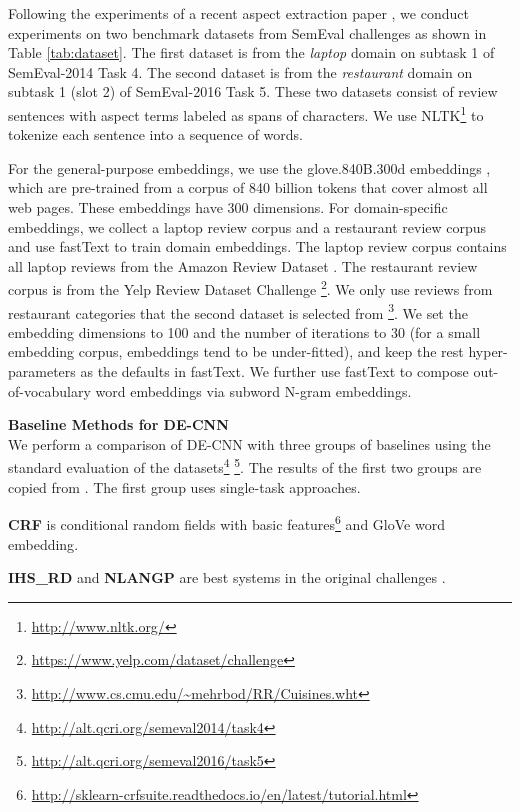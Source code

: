 Following the experiments of a recent aspect extraction paper \cite{li2017deep},
we conduct experiments on two benchmark datasets from SemEval challenges \cite{pontiki2014SemEval,pontiki2016semeval} as shown in Table \ref{tab:dataset}. 
The first dataset is from the \textit{laptop} domain on subtask 1 of SemEval-2014 Task 4.
The second dataset is from the \textit{restaurant} domain on subtask 1 (slot 2) of SemEval-2016 Task 5.
These two datasets consist of review sentences with aspect terms labeled as spans of characters.
We use NLTK\footnote{\url{http://www.nltk.org/} } to tokenize each sentence into a sequence of words. 

For the general-purpose embeddings, we use the glove.840B.300d embeddings \cite{pennington2014glove}, which are pre-trained from a corpus of 840 billion tokens that cover almost all web pages. These embeddings have 300 dimensions.
For domain-specific embeddings, we collect a laptop review corpus and a restaurant review corpus and use fastText \cite{bojanowski2016enriching} to train domain embeddings.  
The laptop review corpus contains all laptop reviews from the Amazon Review Dataset \cite{he2016ups}.
The restaurant review corpus is from the Yelp Review Dataset Challenge \footnote{\url{https://www.yelp.com/dataset/challenge} }.
We only use reviews from restaurant categories that the second dataset is selected from \footnote{\url{http://www.cs.cmu.edu/~mehrbod/RR/Cuisines.wht} }.
We set the embedding dimensions to 100 and the number of iterations to 30 (for a small embedding corpus, embeddings tend to be under-fitted), and keep the rest hyper-parameters as the defaults in fastText.
We further use fastText to compose out-of-vocabulary word embeddings via subword N-gram embeddings.

\textbf{Baseline Methods for DE-CNN}\\
We perform a comparison of DE-CNN with three groups of baselines using the standard evaluation of the datasets\footnote{\url{http://alt.qcri.org/semeval2014/task4}} \footnote{\url{http://alt.qcri.org/semeval2016/task5}}.
The results of the first two groups are copied from \cite{li2017deep}.
The first group uses single-task approaches.

\textbf{CRF} is conditional random fields with basic features\footnote{\url{http://sklearn-crfsuite.readthedocs.io/en/latest/tutorial.html} } and GloVe word embedding\cite{pennington2014glove}.

\textbf{IHS\_RD} \cite{chernyshevich2014ihs} and \textbf{NLANGP} \cite{toh2016nlangp} are best systems in the original challenges \cite{pontiki2014SemEval,pontiki2016semeval}.

